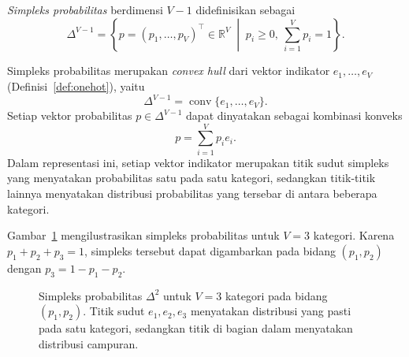 \begin{definisi}
\label{def:simpleks}
\textit{Simpleks probabilitas} berdimensi $V-1$ didefinisikan sebagai
\begin{equation}
    \Delta^{V-1}
    =
    \left\{
    p=(p_1,\dots,p_V)^\top\in\mathbb{R}^{V}
    \;\middle|\;
    p_i\geq 0,\ 
    \sum_{i=1}^{V}p_i=1
    \right\}.
    \label{eq:simpleks}
\end{equation}
\end{definisi}

Simpleks probabilitas merupakan \textit{convex hull} dari vektor
indikator $e_1,\dots,e_V$ (Definisi~\ref{def:onehot}), yaitu
\begin{equation}
    \Delta^{V-1}
    =
    \operatorname{conv}\{e_1,\dots,e_V\}.
\end{equation}
Setiap vektor probabilitas $p\in\Delta^{V-1}$ dapat dinyatakan
sebagai kombinasi konveks
\begin{equation}
    p=\sum_{i=1}^{V}p_i e_i.
\end{equation}
Dalam representasi ini, setiap vektor indikator merupakan titik
sudut simpleks yang menyatakan probabilitas satu pada satu kategori,
sedangkan titik-titik lainnya menyatakan distribusi probabilitas
yang tersebar di antara beberapa kategori.

Gambar~\ref{fig:simpleks} mengilustrasikan simpleks probabilitas
untuk $V=3$ kategori. Karena $p_1+p_2+p_3=1$, simpleks tersebut
dapat digambarkan pada bidang $(p_1,p_2)$ dengan
$p_3=1-p_1-p_2$.

\begin{figure}[H]
\centering
{}
\caption{Simpleks probabilitas $\Delta^2$ untuk $V=3$ kategori
pada bidang $(p_1,p_2)$. Titik sudut $e_1,e_2,e_3$ menyatakan
distribusi yang pasti pada satu kategori, sedangkan titik di bagian
dalam menyatakan distribusi campuran.}
\label{fig:simpleks}
\end{figure}



